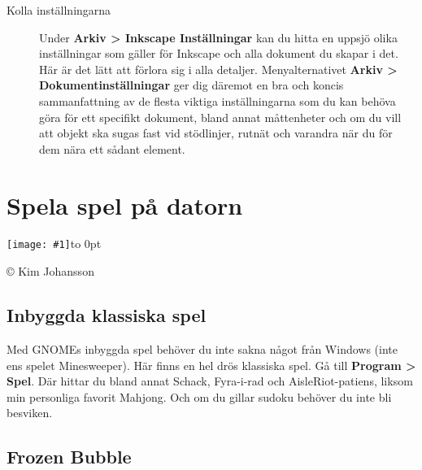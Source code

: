 \documentclass[a4paper,final]{memoir} %
\newcommand{\xrcredit}[1]{\hbox to 0pt{\hspace*{.6\baselineskip}\begin{rotate}{90}{\usefont{T1}{phv}{m}{n}\selectfont\tiny #1}\end{rotate}}}
\newcommand\xintropic[1]{{\texttt{[image: \#1]}\xrcredit{\copyright{} Kim Johansson}}\medskip}
\newcommand\xchapter[2]{\chapter{#2}\begin{center}\xintropic{#1}\end{center}}
\begin{document}
\begin{description}
\item[Kolla inställningarna] Under \textbf{Arkiv \textgreater{} Inkscape Inställningar} kan du hitta en uppsjö olika inställningar som gäller för Inkscape och alla dokument du skapar i det. Här är det lätt att förlora sig i alla detaljer. Menyalternativet \textbf{Arkiv \textgreater{} Dokumentinställningar} ger dig däremot en bra och koncis sammanfattning av de flesta viktiga inställningarna som du kan behöva göra för ett specifikt dokument, bland annat måttenheter och om du vill att objekt ska sugas fast vid stödlinjer, rutnät och varandra när du för dem nära ett sådant element.

\end{description}



\xchapter{bilder804-all/Spela_spel_med_tux}{Spela spel på datorn}\label{cha:spel}



\section{Inbyggda klassiska spel}

Med GNOMEs inbyggda spel behöver du inte sakna något från Windows (inte ens spelet Minesweeper). Här finns en hel drös klassiska spel. Gå till \textbf{Program \textgreater{} Spel}. Där hittar du bland annat Schack, Fyra-i-rad och AisleRiot-patiens, liksom min personliga favorit Mahjong. Och om du gillar sudoku behöver du inte bli besviken. 



\section{Frozen Bubble}
\end{document}
